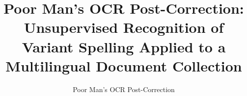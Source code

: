 \documentclass{sig-alternate}
\begin{document}
%

\title{Poor Man's OCR Post-Correction: Unsupervised Recognition of Variant Spelling Applied to a Multilingual Document Collection}
\subtitle{Poor Man's OCR Post-Correction}
%
%
%
%
%
\end{document}
